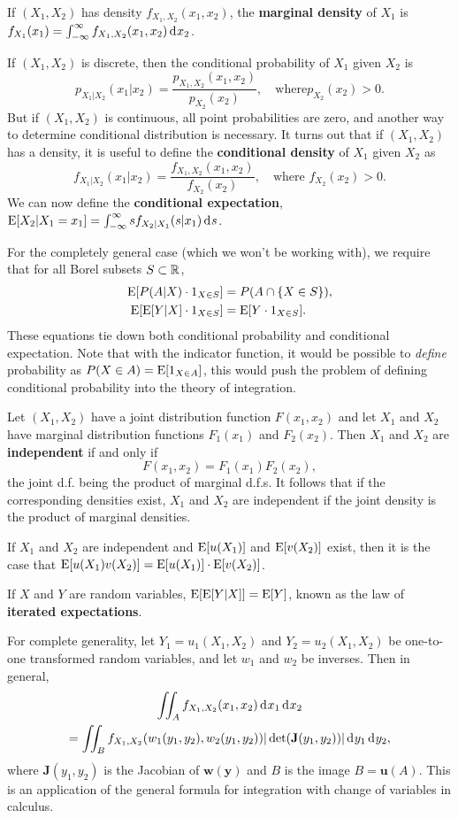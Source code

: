 \documentclass[10pt]{article}
\begin{document}
If $(X_1,X_2)$ has density $f_{X_1,X_2}(x_1,x_2)$, the \textbf{marginal density}
of $X_1$ is  $f_{X_1}(x_1) = \int_{-\infty}^\infty f_{X_1,X_2}(x_1,x_2)\rd x_2$.

If $(X_1,X_2)$ is discrete, then the conditional probability of $X_1$ given $X_2$ is
\[ p_{X_1|X_2}(x_1|x_2) = \frac{p_{X_1,X_2}(x_1,x_2)}{p_{X_2}(x_2)}, \quad \text{where
$p_{X_2}(x_2)>0$}.\] But if $(X_1,X_2)$ is continuous, all point probabilities are
zero, and another way to determine conditional distribution is necessary. It
turns out that if $(X_1,X_2)$ has a density, it is useful to define the
\textbf{conditional density} of $X_1$ given $X_2$ as
\[f_{X_1|X_2}(x_1|x_2)=\frac{f_{X_1,X_2}(x_1,x_2)}{f_{X_2}(x_2)},\quad \text{where $f_{X_2}(x_2)>0$}.\]
We can now define
the \textbf{conditional expectation}, $\E[X_2|X_1=x_1] = \int_{-\infty}^\infty s
f_{X_2|X_1}(s|x_1) \rd s$.

For the completely general case (which we won't be working with), we require
that for all Borel subsets $S\subset \mathbb{R}$,
\begin{align*}
  \operatorname{E}[P(A|X)\cdot 1_{X\in S}] &= P(A\cap \{X\in S\}),  \\
\operatorname{E}[\operatorname{E}[Y|X]\cdot 1_{X\in S}]      &= \operatorname{E}[Y\cdot 1_{X\in S}].
\end{align*}
These equations tie down both conditional probability and conditional
expectation. Note that with the indicator function, it would be possible to 
\emph{define} probability as $P(X\in A) = \operatorname{E}[1_{X\in A}]$, this would push the problem
of defining conditional probability into the theory of integration.




Let $(X_1,X_2)$ have a joint distribution function 
$F(x_1,x_2)$ and let $X_1$ and $X_2$ have marginal distribution functions $F_1(x_1)$
and $F_2(x_2)$. Then $X_1$ and $X_2$ are \textbf{independent} if and only if 
\[F(x_1,x_2)= F_1(x_1) F_2(x_2),\]
the joint d.f. being the product of marginal d.f.s. It follows that if the corresponding
densities exist, $X_1$ and $X_2$ are independent if the joint
density is the product of marginal densities.

If $X_1$ and $X_2$ are independent and $\operatorname{E}[u(X_1)]$ and $\operatorname{E}[v(X_2)]$ exist, then it 
is the case that $\operatorname{E}[u(X_1)v(X_2)] = \operatorname{E}[u(X_1)]\cdot \operatorname{E}[v(X_2)]$.

If $X$ and $Y$ are random variables, $\operatorname{E}\!\left[\operatorname{E}[Y|X]\right] = \operatorname{E}[Y]$, known as the law of
\textbf{iterated expectations}.


For complete generality, let $Y_1=u_1(X_1,X_2)$ and $Y_2=u_2(X_1,X_2)$ be
one-to-one transformed random variables, and let $w_1$ and $w_2$ be inverses.
Then in general, 
\begin{multline*} \int\!\!\!\int_A f_{X_1,X_2}(x_1,x_2)\rd x_1 \rd x_2 \\
= \int\!\!\!\int_B
f_{X_1,X_2} (w_1(y_1,y_2),w_2(y_1,y_2))| \det(\mathbf{J}(y_1,y_2))| \rd y_1
\rd y_2,\end{multline*} 
where $\mathbf{J}(y_1,y_2)$ is the Jacobian of $\mathbf{w}(\mathbf{y})$ and $B$ is
the image $B=\mathbf{u}(A)$. This is an application of the general formula
for integration with change of variables in calculus.
\end{document}
